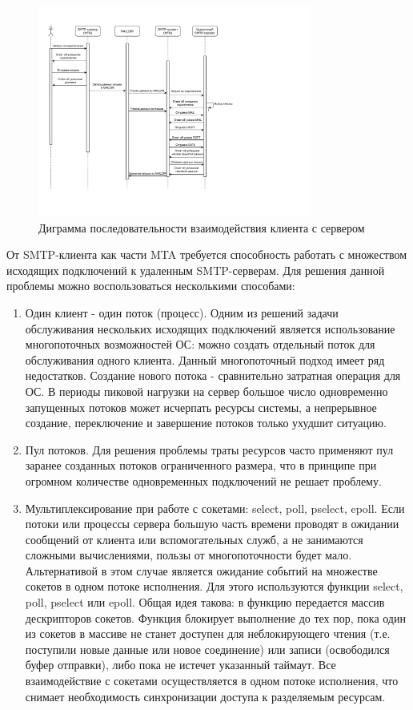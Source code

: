 \documentclass[a4paper,12pt]{report}
\begin{document}
	\begin{figure}[H]
		\centering
		\includegraphics[width=0.8\textwidth]{./resource/diagram_seq.pdf}
		\caption{Диграмма последовательности взаимодействия клиента с сервером} 
		\label{fig:EventLoopSequence}
	\end{figure}

	От SMTP-клиента как части MTA требуется способность работать с множеством исходящих подключений к удаленным SMTP-серверам. Для решения данной проблемы можно воспользоваться несколькими способами:
	\begin{enumerate}
		\item Один клиент - один поток (процесс). Одним из решений задачи обслуживания нескольких исходящих подключений является использование многопоточных возможностей ОС: можно создать отдельный поток для обслуживания одного клиента. Данный многопоточный подход имеет ряд недостатков. Создание нового потока - сравнительно затратная операция для ОС. В периоды пиковой нагрузки на сервер большое число одновременно запущенных потоков может исчерпать ресурсы системы, а непрерывное создание, переключение и завершение потоков только ухудшит ситуацию.
		\item Пул потоков. Для решения проблемы траты ресурсов часто применяют пул заранее созданных потоков ограниченного размера, что в принципе при огромном количестве одновременных подключений не решает проблему.
		\item Мультиплексирование при работе с сокетами: select, poll, pselect, epoll. Если потоки или процессы сервера большую часть времени проводят в ожидании сообщений от клиента или вспомогательных служб, а не занимаются сложными вычислениями, пользы от многопоточности будет мало. Альтернативой в этом случае является ожидание событий на множестве сокетов в одном потоке исполнения. Для этого используются функции select, poll, pselect или epoll. Общая идея такова: в функцию передается массив дескрипторов сокетов. Функция блокирует выполнение до тех пор, пока один из сокетов в массиве не станет доступен для неблокирующего чтения (т.е. поступили новые данные или новое соединение) или записи (освободился буфер отправки), либо пока не истечет указанный таймаут. Все взаимодействие с сокетами осуществляется в одном потоке исполнения, что снимает необходимость синхронизации доступа к разделяемым ресурсам.
	\end{enumerate}
\end{document}
